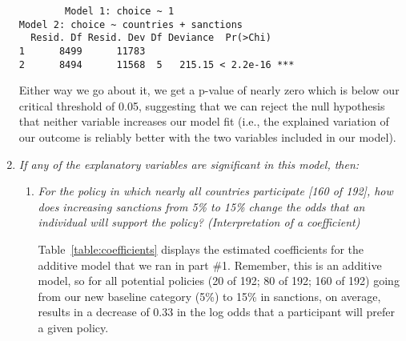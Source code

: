 \documentclass[12pt,letterpaper]{article}
\begin{document}
\begin{enumerate}
	\begin{verbatim}
		Model 1: choice ~ 1
Model 2: choice ~ countries + sanctions
  Resid. Df Resid. Dev Df Deviance  Pr(>Chi)    
1      8499      11783                          
2      8494      11568  5   215.15 < 2.2e-16 ***
	\end{verbatim}
	
	Either way we go about it, we get a p-value of nearly zero which is below our critical threshold of 0.05, suggesting that we can reject the null hypothesis that neither variable increases our model fit (i.e., the explained variation of our outcome is reliably better with the two variables included in our model).
		
	\item
	\textit{If any of the explanatory variables are significant in this model, then:}
	\begin{enumerate}
		\item
		\textit{For the policy in which nearly all countries participate [160 of 192], how does increasing sanctions from 5\% to 15\% change the odds that an individual will support the policy? (Interpretation of a coefficient)}
		
		Table~\ref{table:coefficients} displays the estimated coefficients for the additive model that we ran in part \#1. Remember, this is an additive model, so for all potential policies (20 of 192; 80 of 192; 160 of 192) going from our new baseline category (5\%)  to 15\% in sanctions, on average, results in a decrease of 0.33 in the log odds that a participant will prefer a given policy.
		

\end{enumerate}
\end{enumerate}
\end{document}
